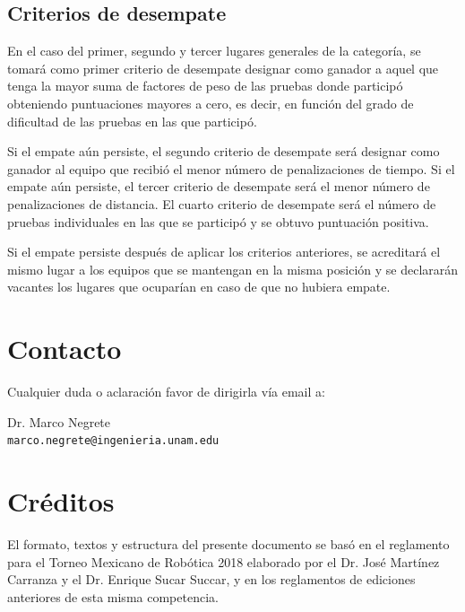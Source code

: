 \documentclass[letterpaper,12pt]{article}
\begin{document}
\subsection{Criterios de desempate}
En el caso del primer, segundo y tercer lugares generales de la categoría, se tomará como primer criterio de desempate designar como ganador a aquel que tenga la mayor suma de factores de peso de las pruebas donde participó obteniendo puntuaciones mayores a cero, es decir, en función del grado de dificultad de las pruebas en las que participó.

Si el empate aún persiste, el segundo criterio de desempate será designar como ganador al equipo que recibió el menor número de penalizaciones de tiempo. Si el empate aún persiste, el tercer criterio de desempate será el menor número de penalizaciones de distancia. El cuarto criterio de desempate será el número de pruebas individuales en las que se participó y se obtuvo puntuación positiva.

Si el empate persiste después de aplicar los criterios anteriores, se acreditará el mismo lugar a los equipos que se mantengan en la misma posición y se declararán vacantes los lugares que ocuparían en caso de que no hubiera empate.

\section{Contacto}
Cualquier duda o aclaración favor de dirigirla vía email a:

Dr. Marco Negrete\\ \texttt{marco.negrete@ingenieria.unam.edu}


\section*{Créditos}
El formato, textos y estructura del presente documento se basó en el reglamento para el Torneo Mexicano de Robótica 2018 elaborado por el Dr. José Martínez Carranza y el Dr. Enrique Sucar Succar, y en los reglamentos de ediciones anteriores de esta misma competencia. 
\end{document}
